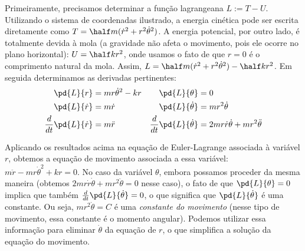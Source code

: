 \begin{question}
    \begin{solution}
      Primeiramente, precisamos determinar a função lagrangeana $L := T - U$.
      Utilizando o sistema de coordenadas ilustrado, a energia cinética pode ser escrita diretamente como $T = \half m (\dot r^2 + r^2 \dot\theta^2)$.
      A energia potencial, por outro lado, é totalmente devida à mola (a gravidade não afeta o movimento, pois ele ocorre no plano horizontal): $U = \half k r^2$, onde usamos o fato de que $r = 0$ é o comprimento natural da mola.
      Assim, $L = \half m (\dot r^2 + r^2 \dot\theta^2) - \half k r^2$.
      Em seguida determinamos as derivadas pertinentes:
      \begin{align*}
        \pd{L}{r} &= mr\dot\theta^2 - kr
          & \pd{L}{\theta} &= 0 \\
        \pd{L}{\dot r} &= m\dot r
          & \pd{L}{\dot\theta} &= mr^2\dot\theta \\
        \frac{d}{dt}\pd{L}{\dot r} &= m\ddot r
          & \frac{d}{dt}\pd{L}{\dot \theta} &= 2mr\dot r\dot\theta + mr^2\ddot \theta
      \end{align*}

      Aplicando os resultados acima na equação de Euler-Lagrange associada à variável $r$, obtemos a equação de movimento associada a essa variável: $m\ddot r - mr\dot\theta^2 + kr = 0$.
      No caso da variável $\theta$, embora possamos proceder da mesma maneira (obtemos $2mr\dot r\dot\theta + mr^2\ddot \theta = 0$ nesse caso), o fato de que $\pd{L}{\theta} = 0$ implica que também $\frac{d}{dt}\pd{L}{\dot \theta} = 0$, o que significa que $\pd{L}{\dot \theta}$ é uma constante.
      Ou seja, $mr^2\dot\theta = C$ é uma \emph{constante do movimento} (nesse tipo de movimento, essa constante é o momento angular).
      Podemos utilizar essa informação para eliminar $\dot\theta$ da equação de $r$, o que simplifica a solução da equação do movimento.
    \end{solution}
\end{question}